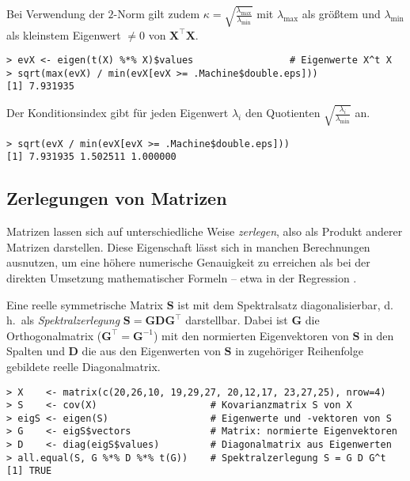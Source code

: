 Bei Verwendung der $2$-Norm gilt zudem $\kappa = \sqrt{\frac{\lambda_{\text{max}}}{\lambda_{\text{min}}}}$ mit $\lambda_{\text{max}}$ als größtem und $\lambda_{\text{min}}$ als kleinstem Eigenwert $\neq 0$ von $\bm{X}^{\top} \bm{X}$.
\begin{lstlisting}
> evX <- eigen(t(X) %*% X)$values                 # Eigenwerte X^t X
> sqrt(max(evX) / min(evX[evX >= .Machine$double.eps]))
[1] 7.931935
\end{lstlisting}

Der Konditionsindex gibt für jeden Eigenwert $\lambda_{i}$ den Quotienten $\sqrt{\frac{\lambda_{i}}{\lambda_{\text{min}}}}$ an.
\begin{lstlisting}
> sqrt(evX / min(evX[evX >= .Machine$double.eps]))
[1] 7.931935 1.502511 1.000000
\end{lstlisting}

\subsection{Zerlegungen von Matrizen}
\label{sec:matDecomp}

Matrizen lassen sich auf unterschiedliche Weise \emph{zerlegen}, also als Produkt anderer Matrizen darstellen. Diese Eigenschaft lässt sich in manchen Berechnungen ausnutzen, um eine höhere numerische Genauigkeit zu erreichen als bei der direkten Umsetzung mathematischer Formeln -- etwa in der Regression \cite{Bates2004}.

Eine reelle symmetrische Matrix $\bm{S}$ ist mit dem Spektralsatz diagonalisierbar, d.\,h.\ als \emph{Spektralzerlegung} $\bm{S} = \bm{G} \bm{D} \bm{G}^{\top}$ darstellbar. Dabei ist $\bm{G}$ die Orthogonalmatrix ($\bm{G}^{\top} = \bm{G}^{-1}$) mit den normierten Eigenvektoren von $\bm{S}$ in den Spalten und $\bm{D}$ die aus den Eigenwerten von $\bm{S}$ in zugehöriger Reihenfolge gebildete reelle Diagonalmatrix.
\begin{lstlisting}
> X    <- matrix(c(20,26,10, 19,29,27, 20,12,17, 23,27,25), nrow=4)
> S    <- cov(X)                    # Kovarianzmatrix S von X
> eigS <- eigen(S)                  # Eigenwerte und -vektoren von S
> G    <- eigS$vectors              # Matrix: normierte Eigenvektoren
> D    <- diag(eigS$values)         # Diagonalmatrix aus Eigenwerten
> all.equal(S, G %*% D %*% t(G))    # Spektralzerlegung S = G D G^t
[1] TRUE
\end{lstlisting}

